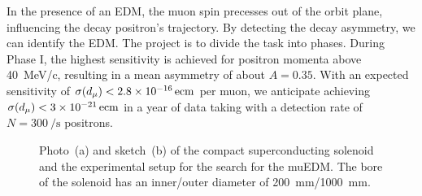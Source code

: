 \begin{refsection}
    \noindent
    In the presence of an EDM, the muon spin precesses out of the orbit plane, influencing the decay positron's trajectory. 
    By detecting the decay asymmetry, we can identify the EDM. 
    The project is to divide the task into phases.
    During Phase I, the highest sensitivity is achieved for positron momenta above \SI{40}{MeV/c}, resulting in a mean asymmetry of about $A=0.35$.
    With an expected sensitivity of $\sigma(d_\mu)<\SI{2.8E-16}{ecm}$ per muon, we anticipate achieving $\sigma(d_\mu)<\SI{3E-21}{ecm}$ in a year of data taking with a detection rate of $N=\SI{300}{\per\second}$ positrons.
    
    \begin{figure}%
    \centering
        \hfill
        \caption[muEDM: magnet and sketch]{Photo~(a) and sketch~(b) of the compact superconducting solenoid and the experimental setup for the search for the muEDM. The bore of the solenoid has an inner/outer diameter of \SI{200}{mm}/\SI{1000}{mm}.}
    \label{fig:PhaseISetup}
    \end{figure}


\end{refsection}
